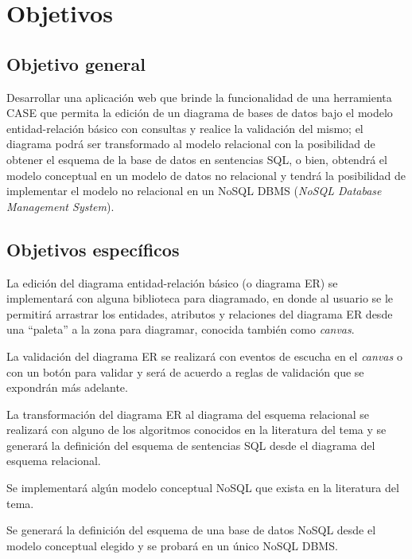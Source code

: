 \section{Objetivos}

\subsection*{Objetivo general}
Desarrollar una aplicación web que brinde la funcionalidad de una herramienta CASE que permita la edición de un diagrama de bases de datos bajo el modelo entidad-relación básico con consultas y realice la validación del mismo; el diagrama podrá ser transformado al modelo relacional con la posibilidad de obtener el esquema de la base de datos en sentencias SQL, o bien, obtendrá el modelo conceptual en un modelo de datos no relacional y tendrá la posibilidad de implementar el modelo no relacional en un NoSQL DBMS (\textit{NoSQL Database Management System}).

\subsection*{Objetivos específicos}

La edición del diagrama entidad-relación básico (o diagrama ER) se implementará con alguna biblioteca para diagramado, en donde al usuario se le permitirá arrastrar los entidades, atributos y relaciones del diagrama ER desde una ``paleta''  a la zona para diagramar, conocida también como \textit{canvas}.


La validación del diagrama ER se realizará con eventos de escucha en el \textit{canvas} o con un botón para validar y será de acuerdo a reglas de validación que se expondrán más adelante.


La transformación del diagrama ER al diagrama del esquema relacional se realizará con alguno de los algoritmos conocidos en la literatura del tema y se generará la definición del esquema de sentencias SQL desde el diagrama del esquema relacional.


Se implementará algún modelo conceptual NoSQL que exista en la literatura del tema.


Se generará la definición del esquema de una base de datos NoSQL desde el modelo conceptual elegido y se probará en un único NoSQL DBMS.